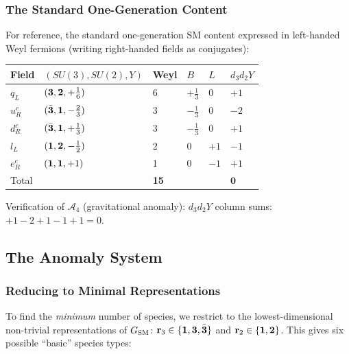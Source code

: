 \documentclass[12pt, a4paper]{article}
\begin{document}
\subsubsection{The Standard One-Generation Content}

For reference, the standard one-generation SM content expressed in
left-handed Weyl fermions (writing right-handed fields as conjugates):

\begin{formalbox}[title={Standard one-generation content (EQ-AM05)}]
{\small
\renewcommand{\arraystretch}{1.30}
\begin{tabular}{p{2.0cm} p{2.5cm} p{1.6cm} p{1.2cm} p{1.2cm} p{1.2cm}}
\toprule
\textbf{Field} & \textbf{$(SU(3), SU(2), Y)$} & \textbf{Weyl} &
$B$ & $L$ & $d_3 d_2 Y$ \\
\midrule
$q_L$   & $({\bf 3},{\bf 2},+\tfrac{1}{6})$ & 6 & $+\tfrac{1}{3}$ & 0 & $+1$ \\
$u_R^c$ & $(\bar{\bf 3},{\bf 1},-\tfrac{2}{3})$ & 3 & $-\tfrac{1}{3}$ & 0 & $-2$ \\
$d_R^c$ & $(\bar{\bf 3},{\bf 1},+\tfrac{1}{3})$ & 3 & $-\tfrac{1}{3}$ & 0 & $+1$ \\
$l_L$   & $({\bf 1},{\bf 2},-\tfrac{1}{2})$ & 2 & 0 & $+1$ & $-1$ \\
$e_R^c$ & $({\bf 1},{\bf 1},+1)$ & 1 & 0 & $-1$ & $+1$ \\
\midrule
Total & & \textbf{15} & & & $\mathbf{0}$ \\
\bottomrule
\end{tabular}
}

\smallskip
Verification of $\mathcal{A}_4$ (gravitational anomaly):
$d_3 d_2 Y$ column sums: $+1 - 2 + 1 - 1 + 1 = 0$. \checkmark
\end{formalbox}

\subsection{The Anomaly System}
\label{sec:anomaly-system}

\subsubsection{Reducing to Minimal Representations}

To find the \emph{minimum} number of species, we restrict to the
lowest-dimensional non-trivial representations of $G_{\rm SM}$:
$\mathbf{r}_3 \in \{{\bf 1}, {\bf 3}, \bar{\bf 3}\}$ and
$\mathbf{r}_2 \in \{{\bf 1}, {\bf 2}\}$. This gives six possible
``basic'' species types:
\end{document}
